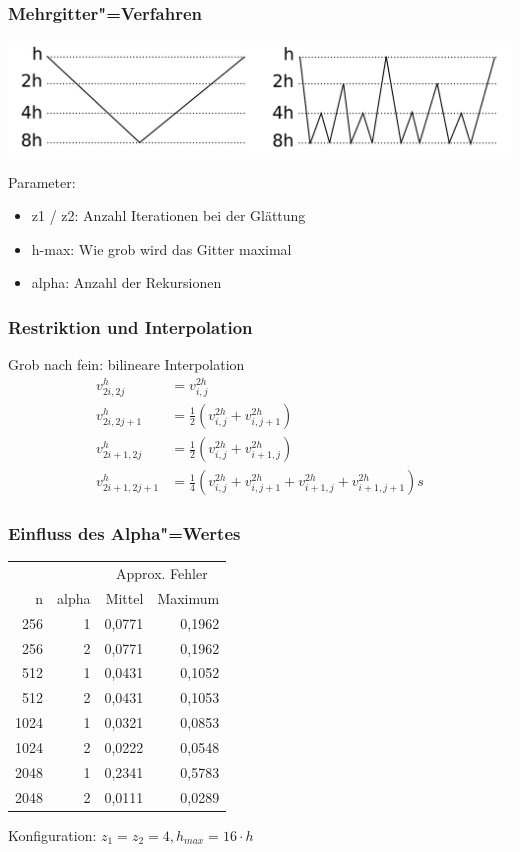 \documentclass{beamer}
\begin{document}
\begin{frame}
    \frametitle{Mehrgitter"=Verfahren}
    \includegraphics[width=\textwidth]{valgorithmus}

    Parameter:
    \begin{itemize}
        \item z1 / z2: Anzahl Iterationen bei der Glättung
        \item h-max: Wie grob wird das Gitter maximal
        \item alpha: Anzahl der Rekursionen
    \end{itemize}
\end{frame}

\begin{frame}
    \frametitle{Restriktion und Interpolation}
    Grob nach fein: bilineare Interpolation
    \begin{equation}
    \begin{split}
    v_{2i,2j}^{h} & = v_{i,j}^{2h} \\
    v_{2i,2j+1}^{h} & = \frac{1}{2}(v_{i,j}^{2h} + v_{i,j+1}^{2h}) \\
    v_{2i+1,2j}^{h} & = \frac{1}{2}(v_{i,j}^{2h} + v_{i+1,j}^{2h}) \\
    v_{2i+1,2j+1}^{h} & = \frac{1}{4}(v_{i,j}^{2h} + v_{i,j+1}^{2h} + v_{i+1,j}^{2h} + v_{i+1,j+1}^{2h})s
    \end{split}
    \end{equation}
\end{frame}

\begin{frame}
    \frametitle{Einfluss des Alpha"=Wertes}
    \begin{center}
    \begin{tabular}{|r|r|r|r|} \hline
    & & \multicolumn{2}{c|}{Approx. Fehler} \\
    n    & alpha & Mittel & Maximum \\ \hline \hline
    256  & 1     & 0,0771 & 0,1962  \\
    256  & 2     & 0,0771 & 0,1962  \\
    512  & 1     & 0,0431 & 0,1052  \\
    512  & 2     & 0,0431 & 0,1053  \\
    1024 & 1     & 0,0321 & 0,0853  \\
    1024 & 2     & 0,0222 & 0,0548  \\
    2048 & 1     & 0,2341 & 0,5783  \\
    2048 & 2     & 0,0111 & 0,0289  \\ \hline
    \end{tabular}
    \end{center}
    Konfiguration: \(z_1 = z_2 = 4, h_{max} = 16 \cdot h\)
\end{frame}
\end{document}
